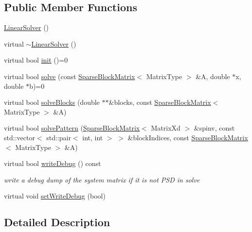 \subsection*{Public Member Functions}
\begin{DoxyCompactItemize}
\item 
\mbox{\hyperlink{classg2o_1_1_linear_solver_a741928aa64f4b6416c9990892e3ede7a}{Linear\+Solver}} ()
\item 
virtual \mbox{\hyperlink{classg2o_1_1_linear_solver_a5157e1221534fae13989c8443adab1ec}{$\sim$\+Linear\+Solver}} ()
\item 
virtual bool \mbox{\hyperlink{classg2o_1_1_linear_solver_aebd961a94ef6de1bc66d2ca41dd2b17b}{init}} ()=0
\item 
virtual bool \mbox{\hyperlink{classg2o_1_1_linear_solver_aa44b40826d50203c8ce2ff258c34e030}{solve}} (const \mbox{\hyperlink{classg2o_1_1_sparse_block_matrix}{Sparse\+Block\+Matrix}}$<$ Matrix\+Type $>$ \&A, double $\ast$x, double $\ast$b)=0
\item 
virtual bool \mbox{\hyperlink{classg2o_1_1_linear_solver_a252e3658b3ba0c3577c33f846c514535}{solve\+Blocks}} (double $\ast$$\ast$\&blocks, const \mbox{\hyperlink{classg2o_1_1_sparse_block_matrix}{Sparse\+Block\+Matrix}}$<$ Matrix\+Type $>$ \&A)
\item 
virtual bool \mbox{\hyperlink{classg2o_1_1_linear_solver_adc74484f72bbe373622581fd597c1be3}{solve\+Pattern}} (\mbox{\hyperlink{classg2o_1_1_sparse_block_matrix}{Sparse\+Block\+Matrix}}$<$ Matrix\+Xd $>$ \&spinv, const std\+::vector$<$ std\+::pair$<$ int, int $>$ $>$ \&block\+Indices, const \mbox{\hyperlink{classg2o_1_1_sparse_block_matrix}{Sparse\+Block\+Matrix}}$<$ Matrix\+Type $>$ \&A)
\item 
virtual bool \mbox{\hyperlink{classg2o_1_1_linear_solver_ac4b23c56cf69759a692906fc8816cf8f}{write\+Debug}} () const
\begin{DoxyCompactList}\small\item\em write a debug dump of the system matrix if it is not P\+SD in solve \end{DoxyCompactList}\item 
virtual void \mbox{\hyperlink{classg2o_1_1_linear_solver_a969c406ccacc38705b2a88f5ed23cb9a}{set\+Write\+Debug}} (bool)
\end{DoxyCompactItemize}


\subsection{Detailed Description}
